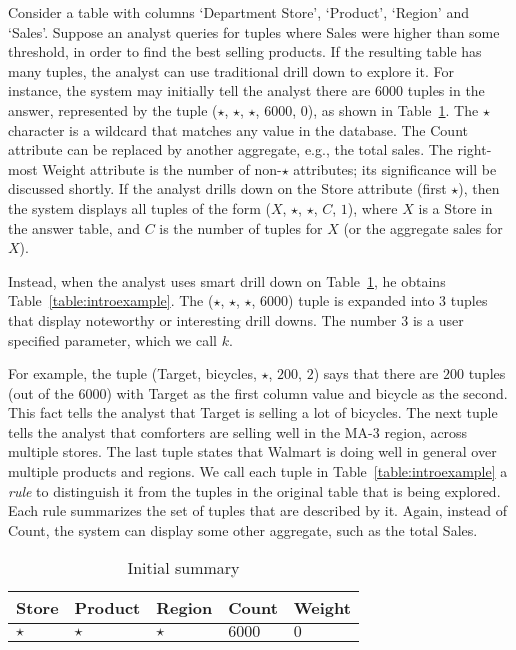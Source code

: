 \begin{example}\label{ex:introexample}
Consider a table with columns `Department Store', `Product', `Region'
and `Sales'. Suppose an analyst queries for tuples
where Sales were higher than some threshold, in order
to find the best selling products.
If the resulting table has many tuples,
the analyst can use traditional drill down to explore it.
For instance, the system may initially tell the analyst there are
6000 tuples in the answer, represented by the tuple ($\star$, $\star$, $\star$, $6000$, $0$),
as shown in Table~\ref{table:introexample0}.
The $\star$ character is a wildcard that matches any value in the database.
The Count attribute can be replaced by another aggregate,
e.g., the total sales.
The right-most Weight attribute is the number of non-$\star$ attributes; 
its significance will be discussed shortly.
If the analyst drills down on the Store attribute (first $\star$),
then the system displays all tuples of the form ($X$, $\star$, $\star$, $C$, $1$),
where $X$ is a Store in the answer table, and $C$
is the number of tuples for $X$ (or the aggregate sales for $X$).

Instead, when the analyst uses smart drill down on Table~\ref{table:introexample0},
he obtains Table~\ref{table:introexample}.
The ($\star$, $\star$, $\star$, $6000$) tuple is expanded into $3$ tuples
that display noteworthy or interesting drill downs.
The number $3$ is a user specified parameter, which we call $k$.

For example, the tuple (Target, bicycles, $\star$, $200$, $2$)
says that there are $200$ tuples (out of the 6000) with
Target as the first column value and bicycle as the second.
This fact tells the analyst that Target is selling a lot of bicycles.
The next tuple tells the analyst that comforters are selling well in
the MA-3 region, across multiple stores. The last tuple
states that Walmart is doing well in general over multiple products and regions.
We call each tuple in Table~\ref{table:introexample} a {\em rule}
to distinguish it from the tuples in the original table that is being explored.
Each rule summarizes the set of tuples that are described by it.
Again, instead of Count, the system can display some other aggregate, such as
the total Sales.

\begin{table}
\centering
\begin{tabular}{| l | l | l | l | l |}
\hline Store & Product & Region & Count & Weight \\
\hline
$\star$ & $\star$ & $\star$ & $6000$ & $0$ \\ \hline
\end{tabular}
\caption{Initial summary}\label{table:introexample0}
\end{table}


\end{example}
